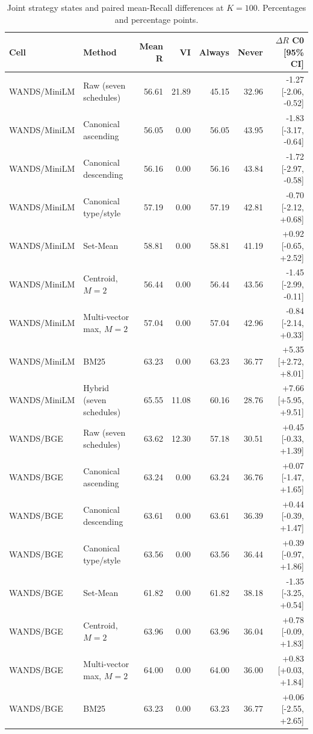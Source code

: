 \begin{table}[t]
\centering
\small
\setlength{\tabcolsep}{4pt}
\caption{Joint strategy states and paired mean-Recall differences at $K=100$. Percentages and percentage points.}
\label{tab:joint_states100}
\begin{tabular}{llrrrrr}
\toprule
Cell & Method & Mean R & VI & Always & Never & $\Delta R$ C0 [95\% CI] \\
\midrule
WANDS/MiniLM & Raw (seven schedules) & 56.61 & 21.89 & 45.15 & 32.96 & -1.27 [-2.06, -0.52] \\
WANDS/MiniLM & Canonical ascending & 56.05 & 0.00 & 56.05 & 43.95 & -1.83 [-3.17, -0.64] \\
WANDS/MiniLM & Canonical descending & 56.16 & 0.00 & 56.16 & 43.84 & -1.72 [-2.97, -0.58] \\
WANDS/MiniLM & Canonical type/style & 57.19 & 0.00 & 57.19 & 42.81 & -0.70 [-2.12, +0.68] \\
WANDS/MiniLM & Set-Mean & 58.81 & 0.00 & 58.81 & 41.19 & +0.92 [-0.65, +2.52] \\
WANDS/MiniLM & Centroid, $M=2$ & 56.44 & 0.00 & 56.44 & 43.56 & -1.45 [-2.99, -0.11] \\
WANDS/MiniLM & Multi-vector max, $M=2$ & 57.04 & 0.00 & 57.04 & 42.96 & -0.84 [-2.14, +0.33] \\
WANDS/MiniLM & BM25 & 63.23 & 0.00 & 63.23 & 36.77 & +5.35 [+2.72, +8.01] \\
WANDS/MiniLM & Hybrid (seven schedules) & 65.55 & 11.08 & 60.16 & 28.76 & +7.66 [+5.95, +9.51] \\
WANDS/BGE & Raw (seven schedules) & 63.62 & 12.30 & 57.18 & 30.51 & +0.45 [-0.33, +1.39] \\
WANDS/BGE & Canonical ascending & 63.24 & 0.00 & 63.24 & 36.76 & +0.07 [-1.47, +1.65] \\
WANDS/BGE & Canonical descending & 63.61 & 0.00 & 63.61 & 36.39 & +0.44 [-0.39, +1.47] \\
WANDS/BGE & Canonical type/style & 63.56 & 0.00 & 63.56 & 36.44 & +0.39 [-0.97, +1.86] \\
WANDS/BGE & Set-Mean & 61.82 & 0.00 & 61.82 & 38.18 & -1.35 [-3.25, +0.54] \\
WANDS/BGE & Centroid, $M=2$ & 63.96 & 0.00 & 63.96 & 36.04 & +0.78 [-0.09, +1.83] \\
WANDS/BGE & Multi-vector max, $M=2$ & 64.00 & 0.00 & 64.00 & 36.00 & +0.83 [+0.03, +1.84] \\
WANDS/BGE & BM25 & 63.23 & 0.00 & 63.23 & 36.77 & +0.06 [-2.55, +2.65] \\

\end{tabular}
\end{table}
